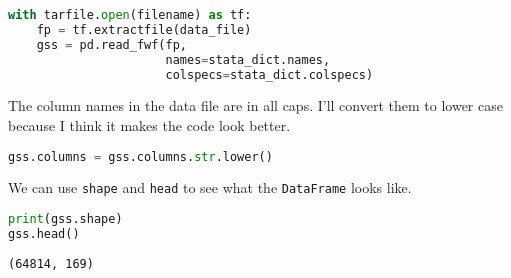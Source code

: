 \begin{lstlisting}[language=Python]
with tarfile.open(filename) as tf:
    fp = tf.extractfile(data_file)  
    gss = pd.read_fwf(fp,
                      names=stata_dict.names,
                      colspecs=stata_dict.colspecs)
\end{lstlisting}

The column names in the data file are in all caps. I'll convert them to
lower case because I think it makes the code look better.

\begin{lstlisting}[language=Python]
gss.columns = gss.columns.str.lower()
\end{lstlisting}

We can use \passthrough{\lstinline!shape!} and
\passthrough{\lstinline!head!} to see what the
\passthrough{\lstinline!DataFrame!} looks like.

\begin{lstlisting}[language=Python]
print(gss.shape)
gss.head()
\end{lstlisting}

\begin{lstlisting}[]
(64814, 169)
\end{lstlisting}

